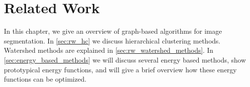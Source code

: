 \chapter{Related Work} \label{ch:reated_work}

In this chapter, we give an overview of graph-based algorithms
for image segmentation.
In \cref{sec:rw_hc} we discuss hierarchical clustering 
methods.
Watershed methods are explained in \cref{sec:rw_watershed_methods}.
In \cref{sec:energy_based_methods} we will discuss
several energy based methods, show prototypical energy functions, and
will give a brief overview how these energy functions can
be optimized.




% 

 

 

 

% 

% 






